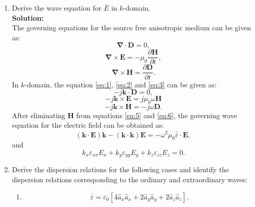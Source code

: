 \documentclass[11pt]{amsart}
\begin{document}
\begin{enumerate}
\item Derive the wave equation for $\bar{E}$ in $k$-domain.
\\
\textbf{Solution:}\\
The governing equations for the source free anisotropic medium can be given as:
\begin{equation}
\label{eq:1}
\mathbf{\nabla}\cdot \mathbf{D}=0,
\end{equation}
\begin{equation}
\label{eq:2}
\mathbf{\nabla}\times \mathbf{E}=-\mu_0 \frac{\partial \mathbf{H}}{\partial t},
\end{equation}
\begin{equation}
\label{eq:3}
 \mathbf{\nabla}\times \mathbf{H}=\frac{\partial \mathbf{D}}{\partial t}.
\end{equation}
In $k$-domain, the equation \ref{eq:1}, \ref{eq:2} and \ref{eq:3} can be given as:
\begin{equation}
\label{eq:4}
-j\mathbf{k}\cdot \mathbf{D}=0,
\end{equation}
\begin{equation}
\label{eq:5}
-j\mathbf{k}\times \mathbf{E}=j \mu_0 \omega \mathbf{H}
\end{equation}
\begin{equation}
\label{eq:6}
-j \mathbf{k}\times \mathbf{H}=-j \omega \mathbf{D}.
\end{equation}
After eliminating $\mathbf{H}$ from equations \ref{eq:5} and \ref{eq:6}, the governing wave equation for the electric field can be obtained as:
\begin{equation}
\label{eq:7}
(\mathbf{k}\cdot \mathbf{E})\mathbf{k}-(\mathbf{k} \cdot \mathbf{k})\mathbf{E}=-\omega^2 \mu_0\overline{\overline{\varepsilon}}\cdot \mathbf{E},
\end{equation}
and 
\begin{equation}
\label{eq:8}
k_x \varepsilon_{xx} E_x + k_y \varepsilon_{yy} E_y +k_z\varepsilon_{zz} E_z=0.
\end{equation}
\item Derive the dispersion relations for the following cases and identify the dispersion relations
corresponding to the ordinary and extraordinary waves:
\begin{enumerate}
\item
\begin{equation*}
\overline{\overline{\varepsilon}}=\varepsilon_0 \left [ 4\hat{a}_x \hat{a}_x +2\hat{a}_y \hat{a}_y +2\hat{a}_z \hat{a}_z \right ]. 

\end{equation*}
\end{enumerate}
\end{enumerate}
\end{document}
